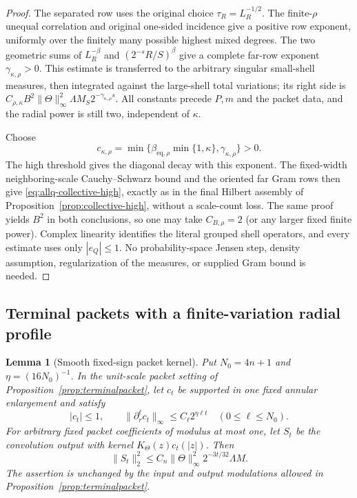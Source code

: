 \documentclass[11pt]{article}
\numberwithin{equation}{section}
\newtheorem{lemma}[theorem]{Lemma}
\theoremstyle{remark}
\theoremstyle{definition}
\begin{document}
\begin{proof}
The separated row uses the original choice $\tau_R=L_R^{-1/2}$.
The finite-$\rho$ unequal correlation and original one-sided incidence
give a positive row exponent, uniformly over the finitely many possible
highest mixed degrees.  The two geometric sums of
$L_R^{-\beta}$ and $(2^{-s}R/S)^\beta$ give a complete far-row exponent
$\gamma_{\kappa,\rho}>0$.  This estimate is transferred to the
arbitrary singular small-shell measures, then integrated against the
large-shell total variations; its right side is
$C_{\rho,\kappa}B^2\|\Theta\|_\infty^2\Lambda
M_S2^{-\gamma_{\kappa,\rho}s}$.
All constants precede $P,m$ and the packet data, and the radial power
is still two, independent of $\kappa$.

Choose
\begin{equation}\label{eq:allq-collective-explicit-choice}
 c_{\kappa,\rho}
 =\min\{\beta_{\mathrm{eq},\rho}\min\{1,\kappa\},
                              \gamma_{\kappa,\rho}\}>0.
\end{equation}
The high threshold gives the diagonal decay with this exponent.
The fixed-width neighboring-scale Cauchy--Schwarz bound and the
oriented far Gram rows then give
\eqref{eq:allq-collective-high}, exactly as in the final Hilbert assembly
of Proposition~\ref{prop:collective-high}, without a scale-count loss.
The same proof yields $B^2$ in both conclusions, so one may take
$C_{B,\rho}=2$ (or any larger fixed finite power).  Complex linearity
identifies the literal grouped shell operators, and every estimate uses
only $|e_Q|\le1$.  No probability-space Jensen step, density assumption,
regularization of the measures, or supplied Gram bound is needed.
\end{proof}

\subsection{Terminal packets with a finite-variation radial profile}

\begin{lemma}[Smooth fixed-sign packet kernel]
\label{lem:allq-smooth-fixed-sign-packet}
Put $N_0=4n+1$ and $\eta=(16N_0)^{-1}$.  In the unit-scale packet
setting of Proposition~\ref{prop:terminalpacket}, let $c_t$ be supported in
one fixed annular enlargement and satisfy
\[
 |c_t|\le1,
 \qquad
 \|\partial_r^\ell c_t\|_\infty\le C_\ell2^{\eta\ell t}
 \quad(0\le\ell\le N_0).
\]
For arbitrary fixed packet coefficients of modulus at most one, let $S_t$
be the convolution output with kernel $K_\Theta(z)c_t(|z|)$.  Then
\begin{equation}\label{eq:allq-smooth-fixed-sign-packet}
 \|S_t\|_2^2
 \le C_n\|\Theta\|_\infty^2
       2^{-3t/32}\Lambda M.
\end{equation}
The assertion is unchanged by the input and output modulations allowed in
Proposition~\ref{prop:terminalpacket}.
\end{lemma}
\end{document}
